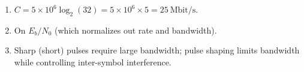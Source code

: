 \begin{enumerate}[leftmargin=1.6em,itemsep=2pt]
\item $C = 5\times10^{6}\log_2(32) = 5\times10^{6}\times5 = 25\ \text{Mbit/s}$.
\item On $E_b/N_0$ (which normalizes out rate and bandwidth).
\item Sharp (short) pulses require large bandwidth; pulse shaping limits bandwidth while controlling inter-symbol interference.
\end{enumerate}

